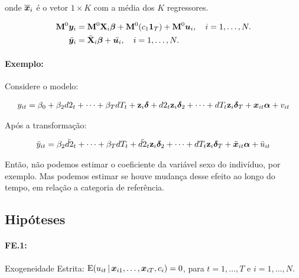 \documentclass[11pt, oneside, a4paper, article]{article}
\numberwithin{equation}{section}
\begin{document}
\noindent
onde $\overline{\boldsymbol{x}}_{i}$ é o vetor $1 \times K$ com a média dos $K$ regressores.

\vspace{-1 em}
\begin{align}
	\notag
	\mathbf{M}^{0} \boldsymbol{y}_{i} &= \mathbf{M}^{0} \mathbf{X}_{i} \boldsymbol{\beta} + \mathbf{M}^{0} ( c_{1} \boldsymbol{1}_{T} ) + \mathbf{M}^{0} \boldsymbol{u}_{i},
	\quad i = 1, \dots, N.
	\\
	\label{fe:mod:ddot:vec}
	\ddot{\boldsymbol{y}}_{i} &= \ddot{\mathbf{X}}_{i} \boldsymbol{\beta} + \ddot{\boldsymbol{u}_{i}},
	\quad i = 1, \dots, N.
\end{align}

\paragraph{Exemplo:} \citep[p.266]{wool-2010} Considere o modelo:

\vspace{-1.5 em}
\begin{align*}
	y_{it} =
	\beta_{0} + \beta_{2} d2_{t} + \dots + \beta_{T} dT_{t}
	+
	\mathbf{z}_{i} \boldsymbol{\delta} + d2_{t} \mathbf{z}_{i} \boldsymbol{\delta}_2  + \dots + dT_{t} \mathbf{z}_{i} \boldsymbol{\delta}_{T} + 
	\boldsymbol{x}_{it} \boldsymbol{\alpha} + v_{it}
\end{align*}

Após a transformação:

\vspace{-1.5 em}
\begin{align*}
	\ddot{y}_{it} =
	\beta_{2} \ddot{d2}_{t} + \dots + \beta_{T} dT_{t}
	+
	\ddot{d2}_{t} \mathbf{z}_{i} \boldsymbol{\delta}_2  + \dots + dT_{t} \mathbf{z}_{i} \boldsymbol{\delta}_{T} + 
	\ddot{\boldsymbol{x}}_{it} \boldsymbol{\alpha} + \ddot{u}_{it}
\end{align*}

Então, não podemos estimar o coeficiente da variável sexo do indivíduo, por exemplo.
Mas podemos estimar se houve mudança desse efeito ao longo do tempo, em relação a categoria de referência.

\subsection{Hipóteses}

\paragraph{FE.1:} Exogeneidade Estrita:
$\text{E}( u _{it} \, | \, \boldsymbol{x}_{i1}, \dots, \boldsymbol{x}_{iT}, c_{i}) = 0$, para $t=1, \dots, T$ e $i = 1, \dots, N$.
\end{document}
